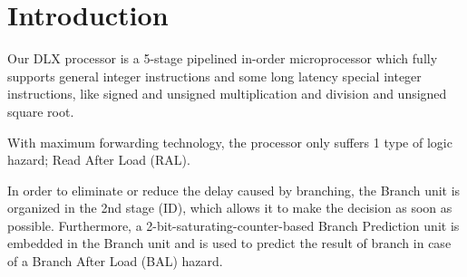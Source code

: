 

\chapter[Introduction]{Introduction}
Our DLX processor is a 5-stage pipelined in-order microprocessor which fully supports
general integer instructions and some long latency special integer instructions,
like signed and unsigned multiplication and division and unsigned square root.

With maximum forwarding technology, the processor only suffers 1 type of logic hazard; 
Read After Load (RAL).

In order to eliminate or reduce the delay caused by branching, the Branch unit is organized
in the 2nd stage (ID), which allows it to make the decision as soon as possible.
Furthermore, a 2-bit-saturating-counter-based Branch Prediction unit is embedded in the Branch unit and is used to
predict the result of branch in case of a Branch After Load (BAL) hazard.

